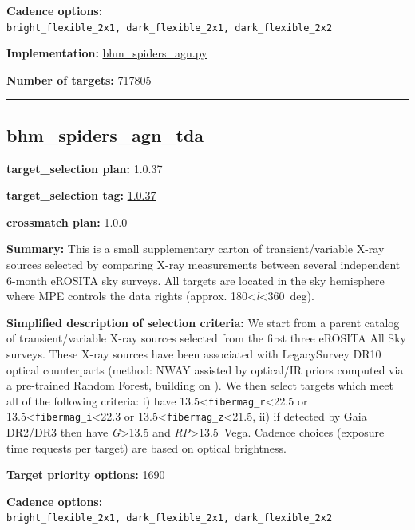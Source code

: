 \noindent\textbf{Cadence options:}
\texttt{bright\_flexible\_2x1,\ dark\_flexible\_2x1,\ dark\_flexible\_2x2}

\noindent\textbf{Implementation:}
\href{https://github.com/sdss/target_selection/blob/1.0.37/python/target_selection/cartons/bhm_spiders_agn.py}{bhm\_spiders\_agn.py}

\noindent\textbf{Number of targets:} 717805

\begin{center}\rule{0.5\linewidth}{0.5pt}\end{center}

\hypertarget{bhm_spiders_agn_tda_plan1.0.37}{%
\subsection{bhm\_spiders\_agn\_tda}\label{bhm_spiders_agn_tda_plan1.0.37}}

\noindent\textbf{target\_selection plan:} 1.0.37

\noindent\textbf{target\_selection tag:}
\href{https://github.com/sdss/target_selection/tree/1.0.37/}{1.0.37}

\noindent\textbf{crossmatch plan:} 1.0.0

\noindent\textbf{Summary:} This is a small supplementary carton of
transient/variable X-ray sources selected by comparing X-ray
measurements between several independent 6-month eROSITA sky surveys.
All targets are located in the sky hemisphere where MPE controls the
data rights (approx. 180\textless{}\emph{l}\textless360~deg).

\noindent\textbf{Simplified description of selection criteria:} We start from a
parent catalog of transient/variable X-ray sources selected from the
first three eROSITA All Sky surveys. These X-ray sources have been
associated with LegacySurvey DR10 optical counterparts (method: NWAY
assisted by optical/IR priors computed via a pre-trained Random Forest,
building on
\citealt{Salvato2022}). We then select targets which meet all of the following
criteria: i) have 13.5\textless{}\texttt{fibermag\_r}\textless22.5 or
13.5\textless{}\texttt{fibermag\_i}\textless22.3 or
13.5\textless{}\texttt{fibermag\_z}\textless21.5, ii) if detected by
Gaia DR2/DR3 then have \emph{G}\textgreater13.5 and
\emph{RP}\textgreater13.5~Vega. Cadence choices (exposure time requests
per target) are based on optical brightness.


\noindent\textbf{Target priority options:} 1690

\noindent\textbf{Cadence options:}
\texttt{bright\_flexible\_2x1,\ dark\_flexible\_2x1,\ dark\_flexible\_2x2}

